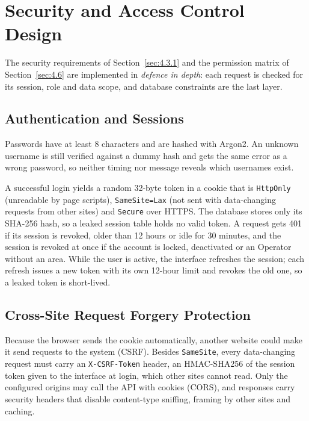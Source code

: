 \section{Security and Access Control Design}
\label{sec:5.5}

The security requirements of Section~\ref{sec:4.3.1} and the permission matrix of Section~\ref{sec:4.6} are implemented in \emph{defence in depth}: each request is checked for its session, role and data scope, and database constraints are the last layer.

\subsection{Authentication and Sessions}
\label{sec:5.5.1}

Passwords have at least 8 characters and are hashed with Argon2. An unknown username is still verified against a dummy hash and gets the same error as a wrong password, so neither timing nor message reveals which usernames exist.

A successful login yields a random 32-byte token in a cookie that is \texttt{HttpOnly} (unreadable by page scripts), \texttt{SameSite=Lax} (not sent with data-changing requests from other sites) and \texttt{Secure} over HTTPS. The database stores only its SHA-256 hash, so a leaked session table holds no valid token. A request gets 401 if its session is revoked, older than 12 hours or idle for 30 minutes, and the session is revoked at once if the account is locked, deactivated or an Operator without an area. While the user is active, the interface refreshes the session; each refresh issues a new token with its own 12-hour limit and revokes the old one, so a leaked token is short-lived.

\subsection{Cross-Site Request Forgery Protection}
\label{sec:5.5.2}

Because the browser sends the cookie automatically, another website could make it send requests to the system (CSRF). Besides \texttt{SameSite}, every data-changing request must carry an \texttt{X-CSRF-Token} header, an HMAC-SHA256 of the session token given to the interface at login, which other sites cannot read. Only the configured origins may call the API with cookies (CORS), and responses carry security headers that disable content-type sniffing, framing by other sites and caching.

